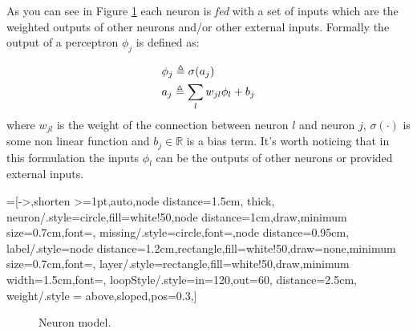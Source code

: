 As you can see in Figure \ref{neuron_model} each neuron is \textit{fed} with a set of inputs which are the weighted outputs of other neurons and/or other external inputs.
Formally the output of a perceptron $\phi_j$
is defined as:
 
\begin{align}
&\phi_j \triangleq \sigma(a_j)\label{def_perceptron_1}\\
&a_j \triangleq \sum_l w_{jl}\phi_l +b_j \label{def_perceptron_2}
\end{align}
where $w_{jl}$ is the weight of the connection between neuron $l$ and neuron $j$, $\sigma(\cdot)$ is some non linear function and $b_j \in \mathbb{R}$ is a bias term.
It's worth noticing that in this formulation the inputs $\phi_l$ can be the outputs of other neurons or provided external inputs.


=[->,shorten >=1pt,auto,node distance=1.5cm,
  thick,
  neuron/.style={circle,fill=white!50,node distance=1cm,draw,minimum size=0.7cm,font=\sffamily\normalsize},
  missing/.style={circle,font=\sffamily\Large,node distance=0.95cm},
  label/.style={node distance=1.2cm,rectangle,fill=white!50,draw=none,minimum size=0.7cm,font=\sffamily\normalsize},
  layer/.style={rectangle,fill=white!50,draw,minimum width=1.5cm,font=\sffamily\Large},
  loopStyle/.style={in=120,out=60, distance=2.5cm},
  weight/.style = {above,sloped,pos=0.3},]
\begin{figure}[h]
 \centering
{}
\caption{Neuron model.}
\label{neuron_model}
\end{figure}


